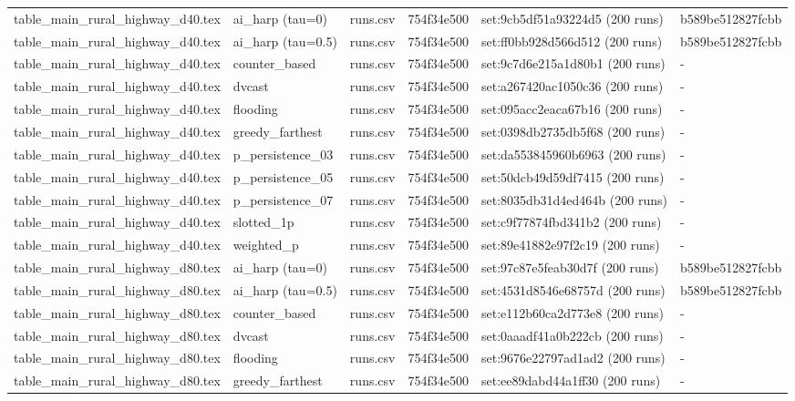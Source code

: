 \begin{tabular}{llllll}
table\_main\_rural\_highway\_d40.tex & ai\_harp (tau=0) & runs.csv & 754f34e500 & set:9cb5df51a93224d5 (200 runs) & b589be512827fcbb \\
table\_main\_rural\_highway\_d40.tex & ai\_harp (tau=0.5) & runs.csv & 754f34e500 & set:ff0bb928d566d512 (200 runs) & b589be512827fcbb \\
table\_main\_rural\_highway\_d40.tex & counter\_based & runs.csv & 754f34e500 & set:9c7d6e215a1d80b1 (200 runs) & - \\
table\_main\_rural\_highway\_d40.tex & dvcast & runs.csv & 754f34e500 & set:a267420ac1050c36 (200 runs) & - \\
table\_main\_rural\_highway\_d40.tex & flooding & runs.csv & 754f34e500 & set:095acc2eaca67b16 (200 runs) & - \\
table\_main\_rural\_highway\_d40.tex & greedy\_farthest & runs.csv & 754f34e500 & set:0398db2735db5f68 (200 runs) & - \\
table\_main\_rural\_highway\_d40.tex & p\_persistence\_03 & runs.csv & 754f34e500 & set:da553845960b6963 (200 runs) & - \\
table\_main\_rural\_highway\_d40.tex & p\_persistence\_05 & runs.csv & 754f34e500 & set:50dcb49d59df7415 (200 runs) & - \\
table\_main\_rural\_highway\_d40.tex & p\_persistence\_07 & runs.csv & 754f34e500 & set:8035db31d4ed464b (200 runs) & - \\
table\_main\_rural\_highway\_d40.tex & slotted\_1p & runs.csv & 754f34e500 & set:c9f77874fbd341b2 (200 runs) & - \\
table\_main\_rural\_highway\_d40.tex & weighted\_p & runs.csv & 754f34e500 & set:89e41882e97f2c19 (200 runs) & - \\
table\_main\_rural\_highway\_d80.tex & ai\_harp (tau=0) & runs.csv & 754f34e500 & set:97c87e5feab30d7f (200 runs) & b589be512827fcbb \\
table\_main\_rural\_highway\_d80.tex & ai\_harp (tau=0.5) & runs.csv & 754f34e500 & set:4531d8546e68757d (200 runs) & b589be512827fcbb \\
table\_main\_rural\_highway\_d80.tex & counter\_based & runs.csv & 754f34e500 & set:e112b60ca2d773e8 (200 runs) & - \\
table\_main\_rural\_highway\_d80.tex & dvcast & runs.csv & 754f34e500 & set:0aaadf41a0b222cb (200 runs) & - \\
table\_main\_rural\_highway\_d80.tex & flooding & runs.csv & 754f34e500 & set:9676e22797ad1ad2 (200 runs) & - \\
table\_main\_rural\_highway\_d80.tex & greedy\_farthest & runs.csv & 754f34e500 & set:ee89dabd44a1ff30 (200 runs) & - \\

\end{tabular}
